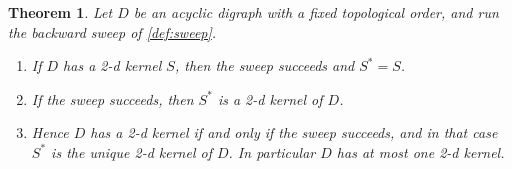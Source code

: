 \documentclass[11pt]{article}
\numberwithin{equation}{section}
\theoremstyle{plain}
\newtheorem{theorem}{Theorem}[section]
\begin{document}
\begin{theorem}\label{thm:dag}
Let $D$ be an acyclic digraph with a fixed topological order, and run the backward sweep
of \cref{def:sweep}.
\begin{enumerate}[label=\textup{(\arabic*)},leftmargin=2.6em]
\item If $D$ has a 2-d kernel $S$, then the sweep succeeds and $S^\ast=S$.
\item If the sweep succeeds, then $S^\ast$ is a 2-d kernel of $D$.
\item Hence $D$ has a 2-d kernel if and only if the sweep succeeds, and in that case
$S^\ast$ is the unique 2-d kernel of $D$. In particular $D$ has at most one 2-d kernel.
\end{enumerate}
\end{theorem}
\end{document}
